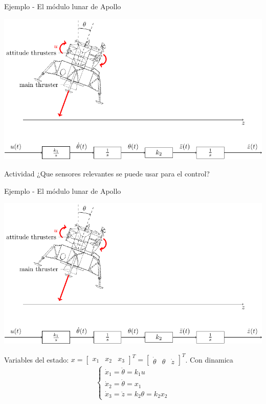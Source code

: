 \documentclass[presentation,aspectratio=1610]{beamer}
\begin{document}
\begin{frame}[label={sec:orgd78927d}]{Ejemplo - El módulo lunar de Apollo}
\begin{center}
\includegraphics[width=0.8\linewidth]{fig-apollo}
\end{center}
\alert{Actividad} ¿Que sensores relevantes se puede usar para el control?
\end{frame}

\begin{frame}[label={sec:orgcb1614f}]{Ejemplo - El módulo lunar de Apollo}
\begin{center}
\includegraphics[width=0.7\linewidth]{fig-apollo}
\end{center}

Variables del estado: \(x = \begin{bmatrix} x_1 & x_2 & x_3 \end{bmatrix}^T = \begin{bmatrix} \dot{\theta} & \theta & \dot{z} \end{bmatrix}^T\). Con dinamica
\[ \begin{cases} \dot{x}_1 =  \ddot{\theta} = k_1 u\\ \dot{x}_2 = \dot{\theta} = x_1\\ \dot{x}_3 = \ddot{z} = k_2\theta = k_2x_2 \end{cases} \]
\end{frame}
\end{document}
